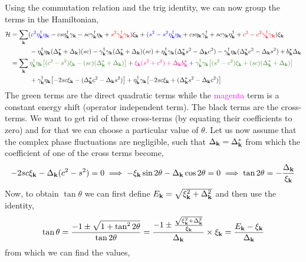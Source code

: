 \documentclass{article}
\newcommand{\SH}{\mathcal{H}}
\newcommand{\vk}{\vb{k}}
\newcommand{\ek}{\eta_{\vk}}
\newcommand{\gk}{\gamma_{\vk}}
\begin{document}
Using the commutation relation and the trig identity, we can now group the terms in the Hamiltonian, 
\begin{align}
    \begin{split}
        \SH &= \sum\limits_{\vk} (\mathcolor{blue}{c^2\ek^\dagger\ek} - cs \ek^\dagger\gk - sc \gk^\dagger\ek +\mathcolor{red}{s^2 \gk^\dagger\gk})\xi_{\vk} +
        (\mathcolor{blue}{s^2 - s^2\ek^\dagger\ek} +cs \ek\gk^\dagger + sc \gk\ek^\dagger+\mathcolor{red}{c^2 - c^2\gk^\dagger\gk})\xi_{\vk}\\
        &\quad\qquad-\ek^\dagger\ek (\Delta_{\vk}^*+\Delta_{\vk})(sc)-\gk^\dagger\gk (\Delta_{\vk}^*+\Delta_{\vk})(sc) +\ek^\dagger\gk (\Delta_{\vk}^*s^2-\Delta_{\vk}c^2) -\gk^\dagger\ek (\Delta_{\vk}^*c^2-\Delta_{\vk}s^2) + b_{\vk}^*\Delta_{\vk}\\
        &=\sum\limits_{\vk} \mathcolor{OliveGreen}{\ek^\dagger \ek \qty[(c^2-s^2)\xi_{\vk} - (sc)(\Delta_{\vk}^* + \Delta_{\vk})]} + \mathcolor{magenta}{\xi_{\vk}({s^2+c^2}) + \Delta_{\vk}b_{\vk}^*}+\mathcolor{OliveGreen}{\gk^\dagger\gk \qty[(s^2-c^2)\xi_{\vk} + (sc)(\Delta_{\vk}^* + \Delta_{\vk})]} \\
        &\quad\qquad+ \gk^\dagger\ek \qty[-2sc\xi_{\vk} -(\Delta_{\vk}^*c^2-\Delta_{\vk}s^2)] + \ek^\dagger\gk\qty[-2sc\xi_{\vk} + (\Delta_{\vk}^* s^2 - \Delta_{\vk}c^2)]
    \end{split} 
\end{align}
The \textcolor{OliveGreen}{green} terms are the direct quadratic terms while the \textcolor{magenta}{magenta} term is a constant energy shift (operator independent term). The black terms are the cross-terms. We want to get rid of these cross-terms (by equating their coefficients to zero) and for that we can choose a particular value of $\theta$. Let us now assume that the complex phase fluctuations are negligible, such that $\Delta_{\vk} = \Delta_{\vk}^*$ from which the coefficient of one of the cross terms become,
\begin{equation}
    -2sc\xi_{\vk} - \Delta_{\vk}(c^2-s^2) = 0 \implies -\xi_{\vk} \sin 2\theta  - \Delta_{\vk} \cos 2\theta =0 \implies \tan 2\theta = -\frac{\Delta_{\vk}}{\xi_{\vk}}
\end{equation}
Now, to obtain $\tan\theta$ we can first define $E_{\vk} = \sqrt{\xi_{\vk}^2+\Delta_{\vk}^2}$ and then use the identity,
$$\tan\theta = \frac{-1 \pm \sqrt{1+\tan^2 2\theta}}{\tan 2\theta} = \frac{-1 \pm \frac{ \sqrt{\xi_{\vk}^2+\Delta_{\vk}^2}}{\xi_{\vk}}}{\Delta_{\vk}}\times \xi_{\vk} = \frac{E_{\vk}-\xi_{\vk}}{\Delta_{\vk}}$$
from which we can find the values,
\end{document}
